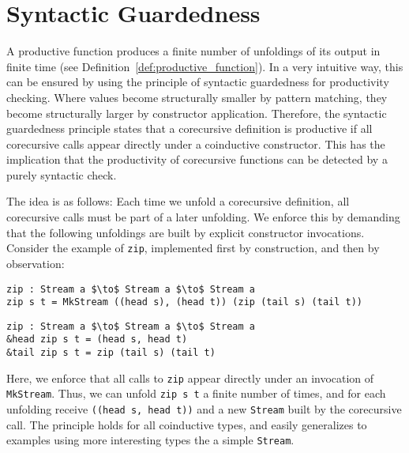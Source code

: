 \section{Syntactic Guardedness}
\label{sec:synt-guard-1}


A productive function produces a finite number of unfoldings of its output in
finite time (see Definition~\ref{def:productive_function}). In a very intuitive
way, this can be ensured by using the principle of syntactic guardedness for
productivity checking. Where values become structurally smaller by pattern
matching, they become structurally larger by constructor application. Therefore,
the syntactic guardedness principle states that a corecursive definition is
productive if all corecursive calls appear directly under a coinductive
constructor. This has the implication that the productivity of corecursive
functions can be detected by a purely syntactic check.

The idea is as follows: Each time we unfold a corecursive definition, all
corecursive calls must be part of a later unfolding. We enforce this by
demanding that the following unfoldings are built by explicit constructor
invocations. Consider the example of \texttt{zip}, implemented first by
construction, and then by observation:
\begin{lstlisting}[mathescape,title=\idrisBlock]
zip : Stream a $\to$ Stream a $\to$ Stream a
zip s t = MkStream ((head s), (head t)) (zip (tail s) (tail t))
\end{lstlisting}
\begin{lstlisting}[mathescape,title=\idrisBlock]
zip : Stream a $\to$ Stream a $\to$ Stream a
&head zip s t = (head s, head t)
&tail zip s t = zip (tail s) (tail t)
\end{lstlisting}
Here, we enforce that all calls to \texttt{zip} appear directly under an
invocation of \texttt{MkStream}. Thus, we can unfold \texttt{zip s
  t} a finite number of times, and for each unfolding receive \texttt{((head s,
  head t))} and a new \texttt{Stream} built by the corecursive call. The
principle holds for all coinductive types, and easily generalizes to examples
using more interesting types the a simple \texttt{Stream}.

